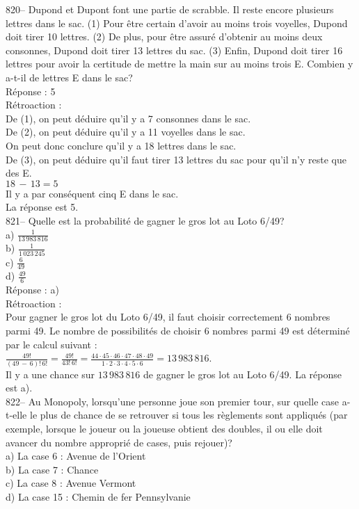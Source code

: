 ﻿\documentclass[letterpaper, 12pt]{article}
\begin{document}
820-- Dupond et Dupont font une partie de scrabble.  Il reste encore
plusieurs lettres dans le sac.  (1) Pour \^etre certain d'avoir au moins
trois voyelles, Dupond doit tirer 10 lettres.  (2) De plus, pour \^etre
assur\'e d'obtenir au moins deux consonnes, Dupond doit tirer 13 lettres du
sac.  (3) Enfin, Dupond doit tirer 16 lettres pour avoir la certitude de
mettre la main sur au moins trois E. Combien y a-t-il de lettres E dans le
sac?\\

R\'eponse : 5\\

R\'etroaction : \\
De (1), on peut d\'eduire qu'il y a 7 consonnes dans le sac.\\
De (2), on peut d\'eduire qu'il y a 11 voyelles dans le sac.\\
On peut donc conclure qu'il y a 18 lettres dans le sac.\\
De (3), on peut d\'eduire qu'il faut tirer 13 lettres du sac pour qu'il n'y
reste que des E.  \\
$18\,-\,13=5$\\
Il y a par cons\'equent cinq E dans le sac.\\
La r\'eponse est 5.\\


821-- Quelle est la probabilit\'e de gagner le gros lot au Loto 6/49?\\
a) $\frac{1}{13\,983\,816}$\\ [2mm] b) $\frac{1}{1\,023\,245}$\\
[2mm] c) $\frac{6}{49}$\\ [2mm]
d) $\frac{49}{6}$\\

R\'eponse : a)\\

R\'etroaction : \\
Pour gagner le gros lot du Loto 6/49, il faut choisir correctement 6 nombres
parmi 49.  Le nombre de possibilit\'es de choisir 6 nombres parmi 49 est
d\'etermin\'e par le calcul suivant :\\[2mm]
$\frac{49!}{\left( 49\,-\,6\right)
!\,6!}=\frac{49!}{43!\,6!}=\frac{44\cdot45\cdot46\cdot47\cdot48\cdot49}{1\cdot2\cdot3\cdot4\cdot5\cdot6}=13\,983\,816$.\\[2mm]
Il y a une chance sur $13\,983\,816$ de gagner le gros lot au Loto 6/49.  La
r\'eponse est a).\\

822-- Au Monopoly, lorsqu'une personne joue son premier tour, sur quelle
case a-t-elle le plus de chance de se retrouver si tous les r\`eglements
sont appliqu\'es (par exemple, lorsque le joueur ou la joueuse obtient des
doubles, il ou elle doit avancer du nombre appropri\'e de cases, puis
rejouer)?\\
a) La case 6 : Avenue de l'Orient\\
b) La case 7 : Chance\\
c) La case 8 : Avenue Vermont\\
d) La case 15 : Chemin de fer Pennsylvanie\\
\end{document}
